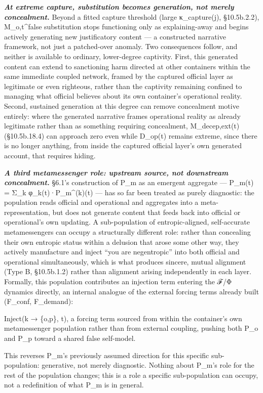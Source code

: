 \documentclass[
]{article}
\begin{document}
\emph{\textbf{At extreme capture, substitution becomes generation, not
merely concealment.}} Beyond a fitted capture threshold (large
κ\_capture(j), §10.5b.2.2), M\_o,t\^{}false substitution stops
functioning only as explaining-away and begins actively generating new
justificatory content --- a constructed narrative framework, not just a
patched-over anomaly. Two consequences follow, and neither is available
to ordinary, lower-degree captivity. First, this generated content can
extend to sanctioning harm directed at other containers within the same
immediate coupled network, framed by the captured official layer as
legitimate or even righteous, rather than the captivity remaining
confined to managing what official believes about its own container's
operational reality. Second, sustained generation at this degree can
remove concealment motive entirely: where the generated narrative frames
operational reality as already legitimate rather than as something
requiring concealment, M\_decep,ext(t) (§10.5b.18.4) can approach zero
even while D\_op(t) remains extreme, since there is no longer anything,
from inside the captured official layer's own generated account, that
requires hiding.

\emph{\textbf{A third metamessenger role: upstream source, not
downstream concealment.}} §6.1's construction of P\_m as an emergent
aggregate --- P\_m(t) = Σ\_k φ\_k(t)·P\_m\^{}(k)(t) --- has so far been
treated as purely diagnostic: the population reads official and
operational and aggregates into a meta-representation, but does not
generate content that feeds back into official or operational's own
updating. A sub-population of entropic-aligned, self-accurate
metamessengers can occupy a structurally different role: rather than
concealing their own entropic status within a delusion that arose some
other way, they actively manufacture and inject ``you are negentropic''
into both official and operational simultaneously, which is what
produces sincere, mutual alignment (Type B, §10.5b.1.2) rather than
alignment arising independently in each layer. Formally, this population
contributes an injection term entering the ℱ/Φ dynamics directly, an
internal analogue of the external forcing terms already built (F\_conf,
F\_demand):

Inject(k → \{o,p\}, t), a forcing term sourced from within the
container's own metamessenger population rather than from external
coupling, pushing both P\_o and P\_p toward a shared false self-model.

This reverses P\_m's previously assumed direction for this specific
sub-population: generative, not merely diagnostic. Nothing about P\_m's
role for the rest of the population changes; this is a role a specific
sub-population can occupy, not a redefinition of what P\_m is in
general.
\end{document}
